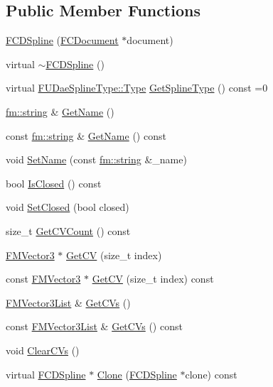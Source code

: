 \subsection*{Public Member Functions}
\begin{DoxyCompactItemize}
\item 
\hyperlink{classFCDSpline_ace689bd475c17da2c24f076e06f47388}{FCDSpline} (\hyperlink{classFCDocument}{FCDocument} $\ast$document)
\item 
virtual \hyperlink{classFCDSpline_abd34e5c4f2b58a8e5acdc8935c91eab1}{$\sim$FCDSpline} ()
\item 
virtual \hyperlink{namespaceFUDaeSplineType_a7db2b90bcd53814239cc29f64754d0ab}{FUDaeSplineType::Type} \hyperlink{classFCDSpline_ad8ad60a198cd8e041fde6587c3d5a9f9}{GetSplineType} () const =0
\item 
\hyperlink{classfm_1_1stringT}{fm::string} \& \hyperlink{classFCDSpline_ab35c5ca0b5d061f9f0290cd34e13003b}{GetName} ()
\item 
const \hyperlink{classfm_1_1stringT}{fm::string} \& \hyperlink{classFCDSpline_a515cfaf72ec0bf42dbc957f02f387c54}{GetName} () const 
\item 
void \hyperlink{classFCDSpline_aa2254be48c6fe64bdd88f58fb8542348}{SetName} (const \hyperlink{classfm_1_1stringT}{fm::string} \&\_\-name)
\item 
bool \hyperlink{classFCDSpline_a17b6ccfe0363f7a7c4bb871a23c10e94}{IsClosed} () const 
\item 
void \hyperlink{classFCDSpline_a3e7e8a8fbc8f2f515c68dec439da887f}{SetClosed} (bool closed)
\item 
size\_\-t \hyperlink{classFCDSpline_a6ca716ecc294857a4f43c46e76507684}{GetCVCount} () const 
\item 
\hyperlink{classFMVector3}{FMVector3} $\ast$ \hyperlink{classFCDSpline_a75c0deef9de2a6b45282fa4168aec72f}{GetCV} (size\_\-t index)
\item 
const \hyperlink{classFMVector3}{FMVector3} $\ast$ \hyperlink{classFCDSpline_a61ac245365a6d33f3403af8393f5a23a}{GetCV} (size\_\-t index) const 
\item 
\hyperlink{classfm_1_1vector}{FMVector3List} \& \hyperlink{classFCDSpline_ae1a48bbf64bce61520d5557ff92c0d4f}{GetCVs} ()
\item 
const \hyperlink{classfm_1_1vector}{FMVector3List} \& \hyperlink{classFCDSpline_a746674509f8ff3a5579c662b269e728f}{GetCVs} () const 
\item 
void \hyperlink{classFCDSpline_afb753c93f0dd00a7482473b44dd89422}{ClearCVs} ()
\item 
virtual \hyperlink{classFCDSpline}{FCDSpline} $\ast$ \hyperlink{classFCDSpline_abff4f438bb811a561891f14e8c0d9c59}{Clone} (\hyperlink{classFCDSpline}{FCDSpline} $\ast$clone) const 
\end{DoxyCompactItemize}
